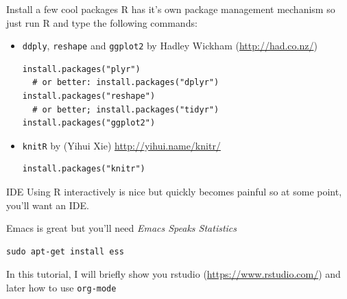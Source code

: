 \documentclass[11pt,xcolor=dvipsnames]{beamer}
\begin{document}
\begin{frame}[fragile,label=sec-4-1-5]{Install a few cool packages}
 R has it's own package management mechanism so just run R and type the
following commands:
\begin{itemize}
\item \texttt{ddply}, \texttt{reshape} and \texttt{ggplot2} by Hadley Wickham (\url{http://had.co.nz/})
\begin{verbatim}
install.packages("plyr")    
  # or better: install.packages("dplyr")
install.packages("reshape") 
  # or better; install.packages("tidyr")
install.packages("ggplot2")
\end{verbatim}
\item \texttt{knitR} by (Yihui Xie) \url{http://yihui.name/knitr/}
\begin{verbatim}
install.packages("knitr")
\end{verbatim}
\end{itemize}
\end{frame}
\begin{frame}[fragile,label=sec-4-1-6]{IDE}
 Using R interactively is nice but quickly becomes painful so at some
point, you'll want an IDE.

\medskip

Emacs is great but you'll need \emph{Emacs Speaks Statistics}
\begin{verbatim}
sudo apt-get install ess
\end{verbatim}
\medskip

\begin{center}
In this tutorial, I will briefly show you \alert{rstudio}
(\url{https://www.rstudio.com/}) and later how to use \texttt{org-mode}
\end{center}
\end{frame}
\end{document}
